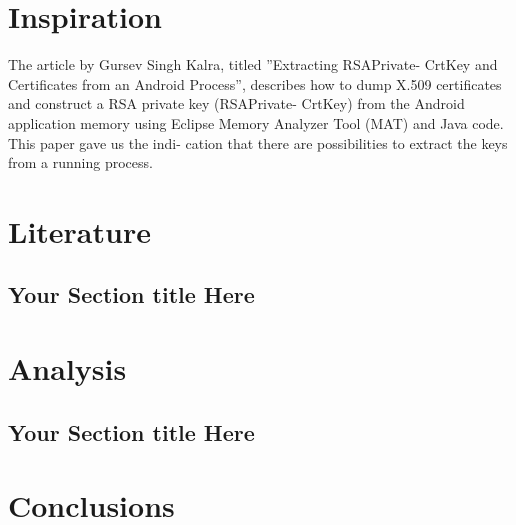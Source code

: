 \documentclass[12pt, a4paper]{report}
\begin{document}
\chapter{Inspiration}
The article by Gursev Singh Kalra, titled ”Extracting RSAPrivate-
CrtKey and Certificates from an Android Process”, describes how to
dump X.509 certificates and construct a RSA private key (RSAPrivate-
CrtKey) from the Android application memory using Eclipse Memory
Analyzer Tool (MAT) and Java code. This paper gave us the indi-
cation that there are possibilities to extract the keys from a running
process.\cite{ref1}

\chapter{Literature}
\section{Your Section title Here}

\chapter{Analysis}
\section{Your Section title Here}

\chapter{Conclusions}



\end{document}
